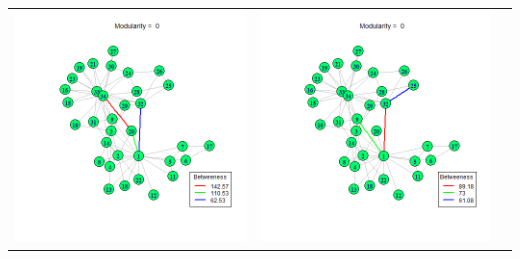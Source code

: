\documentclass[letterpaper,11pt]{report}
\begin{document}
\begin{savenotes}
\begin{table}[htbp]
	\centering
		\begin{tabular}{ccc}
			\includegraphics[scale=0.28]{karateClub-community-0001.png} &
			\includegraphics[scale=0.28]{karateClub-community-0002.png} & 

\end{tabular}
\end{table}
\end{savenotes}
\end{document}

